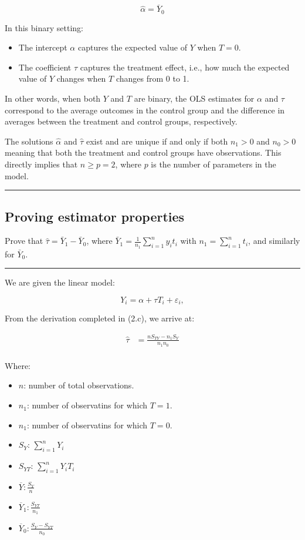 \documentclass{article}
\newenvironment{colorparagraph}[1]{\par\color{#1}}{\par}
\begin{document}
\[
\hat{\alpha} = \overline{Y}_{0}
\]

In this binary setting:

\begin{itemize}
  \item The intercept \( \alpha \) captures the expected value of \( Y \) when \( T = 0 \).
  \item The coefficient \( \tau \) captures the treatment effect, i.e., how much the expected value of \( Y \) changes when \( T \) changes from 0 to 1.
\end{itemize}

In other words, when both \( Y \) and \( T \) are binary, the OLS estimates for \( \alpha \) and \( \tau \) correspond to the average outcomes in the control group and the difference in averages between the treatment and control groups, respectively.

The solutions \(\hat{\alpha}\) and \(\hat{\tau}\) exist and are unique if and only if both \(n_1 > 0\) and \(n_0 > 0\) meaning that both the treatment and control groups have observations. This directly implies that $n \geq p = 2$, where $p$ is the number of parameters in the model. 

\begin{colorparagraph}{questioncolor}
\rule{\textwidth}{0.5pt}

\label{q2d}\subsection{Proving estimator properties}
Prove that \(\hat{\tau} = \bar{Y}_1 - \bar{Y}_0\), where \(\bar{Y}_1 = \frac{1}{n_1} \sum_{i=1}^{n} y_i t_i\) with \(n_1 = \sum_{i=1}^{n} t_i\), and similarly for \(\bar{Y}_0\).

\rule{\textwidth}{0.5pt}
\end{colorparagraph}

We are given the linear model:

\[
Y_i = \alpha + \tau T_i + \varepsilon_i,
\]

From the derivation completed in (2.c), we arrive at:

\begin{align*}
  \hat{\tau} &= \frac{n S_{TY} - n_1 S_Y}{n_1 n_0} \\
\end{align*}

Where:
\begin{itemize}
  \item $n$: number of total observations.
  \item $n_1$: number of observatins for which $T = 1$.
  \item $n_1$: number of observatins for which $T = 0$.
  \item $S_Y$: $\sum_{i = 1}^n Y_i$
  \item $S_{YT}$: $\sum_{i = 1}^n Y_i T_i$
  \item $\overline{Y}: \frac{S_Y}{n}$
  \item $\overline{Y}_1: \frac{S_{YT}}{n_1}$
  \item $\overline{Y}_0: \frac{S_Y - S_{YT}}{n_0}$
\end{itemize}
\end{document}
